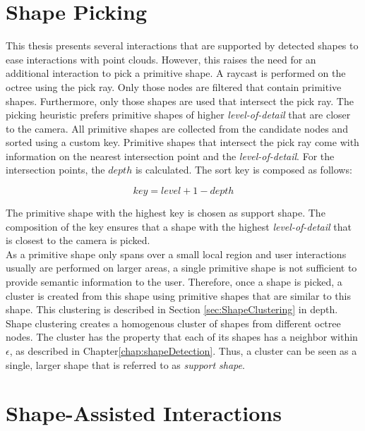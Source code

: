 \section{Shape Picking}
\label{sec:shapePicking}

This thesis presents several interactions that are supported by detected shapes to ease interactions with point clouds.  
However, this raises the need for an additional interaction to pick a primitive shape. A raycast is performed on the octree using the pick ray. Only those nodes are filtered that contain primitive shapes. Furthermore, only those shapes are used that intersect the pick ray. The picking heuristic prefers primitive shapes of higher \textit{level-of-detail} that are closer to the camera. All primitive shapes are collected from the candidate nodes and sorted using a custom key. Primitive shapes that intersect the pick ray come with information on the nearest intersection point and the \textit{level-of-detail}. For the intersection points, the $depth$ is calculated. The sort key is composed as follows: 

$$key = level + 1 - depth$$

The primitive shape with the highest key is chosen as support shape. The composition of the key ensures that a shape with the highest \textit{level-of-detail} that is closest to the camera is picked.
\\
As a primitive shape only spans over a small local region and user interactions usually are performed on larger areas, a single primitive shape is not sufficient to provide semantic information to the user. Therefore, once a shape is picked, a cluster is created from this shape using primitive shapes that are similar to this shape. This clustering is described in Section \ref{sec:ShapeClustering} in depth. Shape clustering creates a homogenous cluster of shapes from different octree nodes. The cluster has the property that each of its shapes has a neighbor within $\epsilon$,
 as described in Chapter\ref{chap:shapeDetection}. Thus, a cluster can be seen as a single, larger shape that is referred to as \textit{support shape}.


\section{Shape-Assisted Interactions}
\label{sec:interactions}

